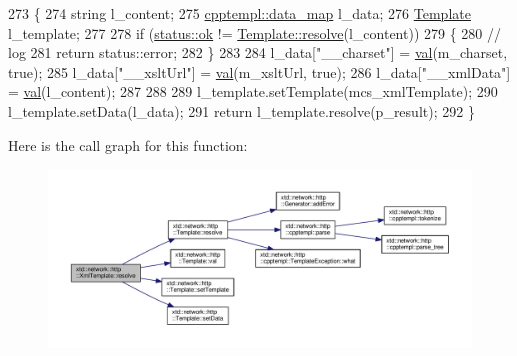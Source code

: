 \begin{DoxyCode}
273 \{
274   \textcolor{keywordtype}{string}        l\_content;
275   \hyperlink{namespacextd_1_1network_1_1http_1_1cpptempl_a638d1d81c8fb63c0bbafd508d6a2a007}{cpptempl::data\_map} l\_data;
276   \hyperlink{classxtd_1_1network_1_1http_1_1Template_a1887dcae44d24a8594bc41a349a7e6fe}{Template}           l\_template;
277 
278   \textcolor{keywordflow}{if} (\hyperlink{namespacextd_1_1network_1_1http_a55148922a7d13fe756e53e2ccad4b89ca444bcb3a3fcf8389296c49467f27e1d6}{status::ok} != \hyperlink{classxtd_1_1network_1_1http_1_1Template_a476ce5e5b8465ea80ade07c003ab5cfd}{Template::resolve}(l\_content))
279   \{
280     \textcolor{comment}{// log}
281     \textcolor{keywordflow}{return} status::error;
282   \}
283 
284   l\_data[\textcolor{stringliteral}{"\_\_charset"}] = \hyperlink{classxtd_1_1network_1_1http_1_1Template_aab2224df74586a476877a36db8ea2473}{val}(m\_charset, \textcolor{keyword}{true});
285   l\_data[\textcolor{stringliteral}{"\_\_xsltUrl"}] = \hyperlink{classxtd_1_1network_1_1http_1_1Template_aab2224df74586a476877a36db8ea2473}{val}(m\_xsltUrl, \textcolor{keyword}{true});
286   l\_data[\textcolor{stringliteral}{"\_\_xmlData"}] = \hyperlink{classxtd_1_1network_1_1http_1_1Template_aab2224df74586a476877a36db8ea2473}{val}(l\_content);
287 
288 
289   l\_template.setTemplate(mcs\_xmlTemplate);
290   l\_template.setData(l\_data);
291   \textcolor{keywordflow}{return} l\_template.resolve(p\_result);
292 \}
\end{DoxyCode}


Here is the call graph for this function\-:
\nopagebreak
\begin{figure}[H]
\begin{center}
\leavevmode
\includegraphics[width=350pt]{classxtd_1_1network_1_1http_1_1XmlTemplate_ab221547a643e3db5ba99640fe14b9f68_cgraph}
\end{center}
\end{figure}


